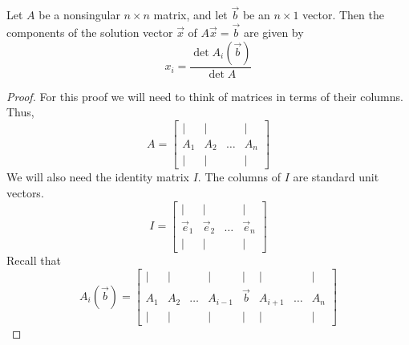 \documentclass{ximera}
\begin{document}
\begin{theorem}\label{th:cramer}
Let $A$ be a nonsingular $n\times n$ matrix, and let $\vec{b}$ be an $n\times 1$ vector.  Then the components of the solution vector $\vec{x}$ of $A\vec{x}=\vec{b}$ are given by
$$x_i=\frac{\det{A_i(\vec{b})}}{\det{A}}$$
\end{theorem}
\begin{proof}
For this proof we will need to think of matrices in terms of their columns.  Thus,
$$A=\begin{bmatrix}
           | & |& &|\\
		A_1 & A_2&\dots&A_n\\
		| & |& &|
         \end{bmatrix}$$
We will also need the identity matrix $I$.  The columns of $I$ are standard unit vectors.
$$I=\begin{bmatrix}
           | & |& &|\\
		\vec{e}_1 & \vec{e}_2&\dots&\vec{e}_n\\
		| & |& &|
         \end{bmatrix}$$
Recall that 
$$A_i(\vec{b})=\begin{bmatrix}
           | & |& &|&|&|&&|\\
		A_1 & A_2&\dots &A_{i-1}&\vec{b}&A_{i+1}&\dots&A_n\\
		| & |& &|&|&|&&|
         \end{bmatrix}$$
         

\end{proof}
\end{document}
